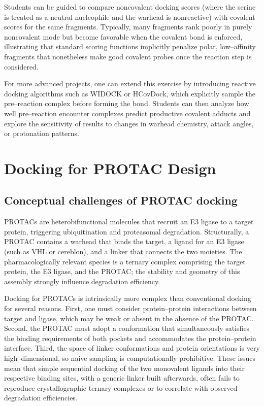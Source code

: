 \documentclass[12pt]{article}
\begin{document}
Students can be guided to compare noncovalent docking scores (where the serine is treated as a neutral nucleophile and the warhead is nonreactive) with covalent scores for the same fragments.  
Typically, many fragments rank poorly in purely noncovalent mode but become favorable when the covalent bond is enforced, illustrating that standard scoring functions implicitly penalize polar, low–affinity fragments that nonetheless make good covalent probes once the reaction step is considered.\cite{CH14_CovalentLargeLibraries2014,CH14_CovalentDockingReview2015} 

For more advanced projects, one can extend this exercise by introducing reactive docking algorithms such as WIDOCK or HCovDock, which explicitly sample the pre–reaction complex before forming the bond.\cite{CH14_WIDOCK2021,CH14_HCovDock2023}
Students can then analyze how well pre–reaction encounter complexes predict productive covalent adducts and explore the sensitivity of results to changes in warhead chemistry, attack angles, or protonation patterns.

\section{Docking for PROTAC Design}

\subsection{Conceptual challenges of PROTAC docking}

PROTACs are heterobifunctional molecules that recruit an E3 ligase to a target protein, triggering ubiquitination and proteasomal degradation.  
Structurally, a PROTAC contains a warhead that binds the target, a ligand for an E3 ligase (such as VHL or cereblon), and a linker that connects the two moieties.  
The pharmacologically relevant species is a ternary complex comprising the target protein, the E3 ligase, and the PROTAC; the stability and geometry of this assembly strongly influence degradation efficiency.

Docking for PROTACs is intrinsically more complex than conventional docking for several reasons.  
First, one must consider protein–protein interactions between target and ligase, which may be weak or absent in the absence of the PROTAC.  
Second, the PROTAC must adopt a conformation that simultaneously satisfies the binding requirements of both pockets and accommodates the protein–protein interface.  
Third, the space of linker conformations and protein orientations is very high–dimensional, so naive sampling is computationally prohibitive.  
These issues mean that simple sequential docking of the two monovalent ligands into their respective binding sites, with a generic linker built afterwards, often fails to reproduce crystallographic ternary complexes or to correlate with observed degradation efficiencies.\cite{CH14_Drummond2020,CH14_PRosettaC2020}
\end{document}
